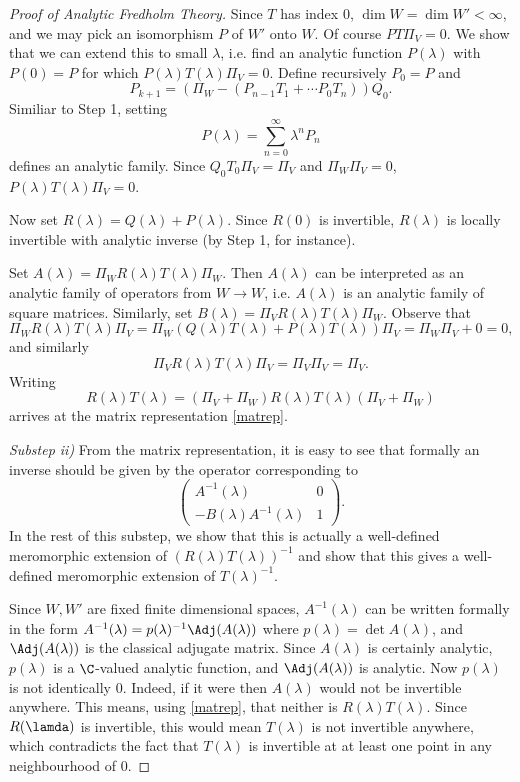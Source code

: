 \documentclass[12pt]{article}
\begin{document}
\begin{proof}[Proof of Analytic Fredholm Theory]
Since $T$ has index $0$, $\dim W = \dim W' < \infty$, and we may pick an isomorphism $P$ of $W'$ onto $W$. Of course $PT\Pi_V = 0$. We show that we can extend this to small $\lambda$, i.e. find an analytic function $P(\lambda)$ with $P(0) = P$ for which $P(\lambda)T(\lambda)\Pi_V = 0$. Define recursively $P_0 = P$ and
\[P_{k+1} = (\Pi_W-(P_{n-1}T_1+\cdots P_0T_n))Q_0.\]
Similiar to Step 1, setting
\[P(\lambda) = \sum_{n=0}^\infty \lambda^nP_n\] defines an analytic family. Since $Q_0T_0\Pi_V = \Pi_V$ and $\Pi_W\Pi_V = 0$, $P(\lambda)T(\lambda)\Pi_V = 0$.

Now set $R(\lambda) = Q(\lambda)+P(\lambda)$. Since $R(0)$ is invertible, $R(\lambda)$ is locally invertible with analytic inverse (by Step 1, for instance).

Set $A(\lambda) = \Pi_WR(\lambda)T(\lambda)\Pi_W$. Then $A(\lambda)$ can be interpreted as an analytic family of operators from $W \to W$, i.e. $A(\lambda)$ is an analytic family of square matrices. Similarly, set $B(\lambda) = \Pi_VR(\lambda)T(\lambda)\Pi_W$. Observe that 
\[\Pi_W R(\lambda)T(\lambda)\Pi_V = \Pi_W(Q(\lambda)T(\lambda) + P(\lambda)T(\lambda))\Pi_V = \Pi_W\Pi_V + 0 = 0,\]
and similarly
\[\Pi_VR(\lambda)T(\lambda)\Pi_V =  \Pi_V\Pi_V = \Pi_V.\] Writing
\[R(\lambda)T(\lambda) = (\Pi_V+\Pi_W)R(\lambda)T(\lambda)(\Pi_V+\Pi_W)\] arrives at the matrix representation \eqref{matrep}.

\emph{Substep ii)} From the matrix representation, it is easy to see that formally an inverse should be given by the operator corresponding to
\begin{equation}\begin{pmatrix} A^{-1}(\lambda) & 0\\
-B(\lambda)A^{-1}(\lambda) & 1\end{pmatrix}.\end{equation}In the rest of this substep, we show that this is actually a well-defined meromorphic extension of $(R(\lambda)T(\lambda))^{-1}$ and show that this gives a well-defined meromorphic extension of $T(\lambda)^{-1}$.

Since $W,W'$ are fixed finite dimensional spaces, $A^{-1}(\lambda)$ can be written formally in the form $A^{-1}(\lambda) = p(\lambda)^{-1}\Adj(A(\lambda))$ where $p(\lambda) = \det A(\lambda)$, and $\Adj(A(\lambda))$ is the classical adjugate matrix. Since $A(\lambda)$ is certainly analytic, $p(\lambda)$ is a $\C$-valued analytic function, and $\Adj(A(\lambda))$ is analytic. Now $p(\lambda)$ is not identically $0$. Indeed, if it were then $A(\lambda)$ would not be invertible anywhere. This means, using \eqref{matrep}, that neither is $R(\lambda)T(\lambda)$. Since $R(\lamda)$ is invertible, this would mean $T(\lambda)$ is not invertible anywhere, which contradicts the fact that $T(\lambda)$ is invertible at at least one point in any neighbourhood of $0$.


\end{proof}
\end{document}
